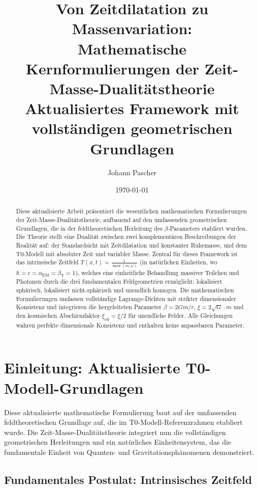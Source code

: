 \documentclass[12pt,a4paper]{article}
\title{Von Zeitdilatation zu Massenvariation: \\ Mathematische Kernformulierungen der Zeit-Masse-Dualitätstheorie \\ \large Aktualisiertes Framework mit vollständigen geometrischen Grundlagen}
\author{Johann Pascher}
\date{\today}
\newcommand{\Tfield}{T(x,t)}
\theoremstyle{definition}
\theoremstyle{remark}
\begin{document}
	
	\maketitle
	
	\begin{abstract}
		Diese aktualisierte Arbeit präsentiert die wesentlichen mathematischen Formulierungen der Zeit-Masse-Dualitätstheorie, aufbauend auf den umfassenden geometrischen Grundlagen, die in der feldtheoretischen Herleitung des $\beta$-Parameters etabliert wurden. Die Theorie stellt eine Dualität zwischen zwei komplementären Beschreibungen der Realität auf: der Standardsicht mit Zeitdilatation und konstanter Ruhemasse, und dem T0-Modell mit absoluter Zeit und variabler Masse. Zentral für dieses Framework ist das intrinsische Zeitfeld $\Tfield = \frac{1}{\max(m, \omega)}$ (in natürlichen Einheiten, wo $\hbar = c = \alpha_{\text{EM}} = \beta_{\text{T}} = 1$), welches eine einheitliche Behandlung massiver Teilchen und Photonen durch die drei fundamentalen Feldgeometrien ermöglicht: lokalisiert sphärisch, lokalisiert nicht-sphärisch und unendlich homogen. Die mathematischen Formulierungen umfassen vollständige Lagrange-Dichten mit strikter dimensionaler Konsistenz und integrieren die hergeleiteten Parameter $\beta = 2Gm/r$, $\xi = 2\sqrt{G} \cdot m$ und den kosmischen Abschirmfaktor $\xi_{\text{eff}} = \xi/2$ für unendliche Felder. Alle Gleichungen wahren perfekte dimensionale Konsistenz und enthalten keine anpassbaren Parameter.
	\end{abstract}
	
	\tableofcontents
	\newpage
	
	\section{Einleitung: Aktualisierte T0-Modell-Grundlagen}
	
	Diese aktualisierte mathematische Formulierung baut auf der umfassenden feldtheoretischen Grundlage auf, die im T0-Modell-Referenzrahmen etabliert wurde. Die Zeit-Masse-Dualitätstheorie integriert nun die vollständigen geometrischen Herleitungen und ein natürliches Einheitensystem, das die fundamentale Einheit von Quanten- und Gravitationsphänomenen demonstriert.
	
	\subsection{Fundamentales Postulat: Intrinsisches Zeitfeld}
	\label{subsec:fundamentales_postulat}
	
\end{document}
